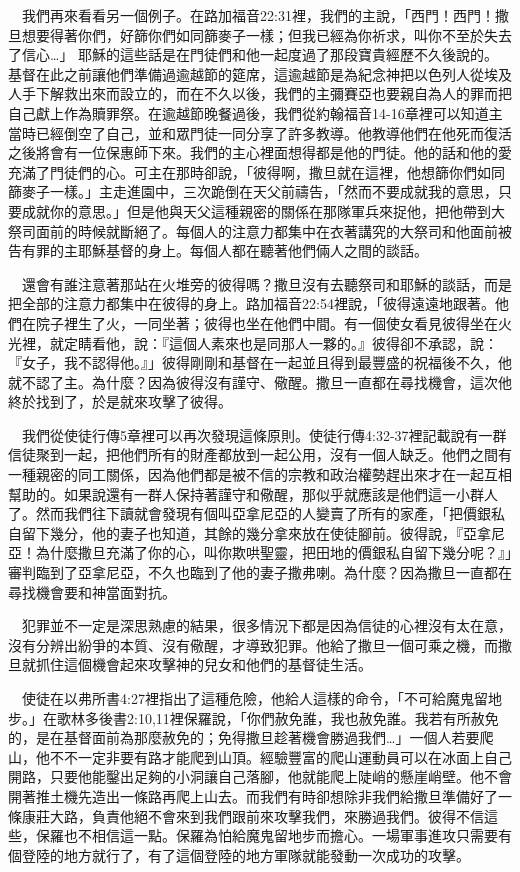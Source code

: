 \documentclass{book}
\begin{document}
　我們再來看看另一個例子。在路加福音22:31裡，我們的主說，「西門！西門！撒旦想要得著你們，好篩你們如同篩麥子一樣；但我已經為你祈求，叫你不至於失去了信心…」 耶穌的這些話是在門徒們和他一起度過了那段寶貴經歷不久後說的。基督在此之前讓他們準備過逾越節的筵席，這逾越節是為紀念神把以色列人從埃及人手下解救出來而設立的，而在不久以後，我們的主彌賽亞也要親自為人的罪而把自己獻上作為贖罪祭。在逾越節晚餐過後，我們從約翰福音14-16章裡可以知道主當時已經倒空了自己，並和眾門徒一同分享了許多教導。他教導他們在他死而復活之後將會有一位保惠師下來。我們的主心裡面想得都是他的門徒。他的話和他的愛充滿了門徒們的心。可主在那時卻說，「彼得啊，撒旦就在這裡，他想篩你們如同篩麥子一樣。」主走進園中，三次跪倒在天父前禱告，「然而不要成就我的意思，只要成就你的意思。」但是他與天父這種親密的關係在那隊軍兵來捉他，把他帶到大祭司面前的時候就斷絕了。每個人的注意力都集中在衣著講究的大祭司和他面前被告有罪的主耶穌基督的身上。每個人都在聽著他們倆人之間的談話。

　還會有誰注意著那站在火堆旁的彼得嗎？撒旦沒有去聽祭司和耶穌的談話，而是把全部的注意力都集中在彼得的身上。路加福音22:54裡說，「彼得遠遠地跟著。他們在院子裡生了火，一同坐著；彼得也坐在他們中間。有一個使女看見彼得坐在火光裡，就定睛看他，說：『這個人素來也是同那人一夥的。』彼得卻不承認，說：『女子，我不認得他。』」彼得剛剛和基督在一起並且得到最豐盛的祝福後不久，他就不認了主。為什麼？因為彼得沒有謹守、儆醒。撒旦一直都在尋找機會，這次他終於找到了，於是就來攻擊了彼得。

　我們從使徒行傳5章裡可以再次發現這條原則。使徒行傳4:32-37裡記載說有一群信徒聚到一起，把他們所有的財產都放到一起公用，沒有一個人缺乏。他們之間有一種親密的同工關係，因為他們都是被不信的宗教和政治權勢趕出來才在一起互相幫助的。如果說還有一群人保持著謹守和儆醒，那似乎就應該是他們這一小群人了。然而我們往下讀就會發現有個叫亞拿尼亞的人變賣了所有的家產，「把價銀私自留下幾分，他的妻子也知道，其餘的幾分拿來放在使徒腳前。彼得說，『亞拿尼亞！為什麼撒旦充滿了你的心，叫你欺哄聖靈，把田地的價銀私自留下幾分呢？』」審判臨到了亞拿尼亞，不久也臨到了他的妻子撒弗喇。為什麼？因為撒旦一直都在尋找機會要和神當面對抗。

　犯罪並不一定是深思熟慮的結果，很多情況下都是因為信徒的心裡沒有太在意，沒有分辨出紛爭的本質、沒有儆醒，才導致犯罪。他給了撒旦一個可乘之機，而撒旦就抓住這個機會起來攻擊神的兒女和他們的基督徒生活。

　使徒在以弗所書4:27裡指出了這種危險，他給人這樣的命令，「不可給魔鬼留地步。」在歌林多後書2:10,11裡保羅說，「你們赦免誰，我也赦免誰。我若有所赦免的，是在基督面前為那麼赦免的；免得撒旦趁著機會勝過我們…」一個人若要爬山，他不不一定非要有路才能爬到山頂。經驗豐富的爬山運動員可以在冰面上自己開路，只要他能鑿出足夠的小洞讓自己落腳，他就能爬上陡峭的懸崖峭壁。他不會開著推土機先造出一條路再爬上山去。而我們有時卻想除非我們給撒旦準備好了一條康莊大路，負責他絕不會來到我們跟前來攻擊我們，來勝過我們。彼得不信這些，保羅也不相信這一點。保羅為怕給魔鬼留地步而擔心。一場軍事進攻只需要有個登陸的地方就行了，有了這個登陸的地方軍隊就能發動一次成功的攻擊。
\end{document}
